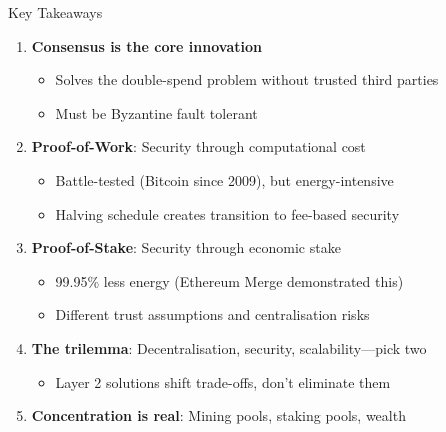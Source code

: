 \documentclass[10pt]{beamer}
\begin{document}
\begin{frame}{Key Takeaways}
  \begin{enumerate}
    \item \textbf{Consensus is the core innovation}
    \begin{itemize}
      \item Solves the double-spend problem without trusted third parties
      \item Must be Byzantine fault tolerant
    \end{itemize}
    
    \vspace{0.3em}
    \item \textbf{Proof-of-Work}: Security through computational cost
    \begin{itemize}
      \item Battle-tested (Bitcoin since 2009), but energy-intensive
      \item Halving schedule creates transition to fee-based security
    \end{itemize}
    
    \vspace{0.3em}
    \item \textbf{Proof-of-Stake}: Security through economic stake
    \begin{itemize}
      \item 99.95\% less energy (Ethereum Merge demonstrated this)
      \item Different trust assumptions and centralisation risks
    \end{itemize}
    
    \vspace{0.3em}
    \item \textbf{The trilemma}: Decentralisation, security, scalability---pick two
    \begin{itemize}
      \item Layer 2 solutions shift trade-offs, don't eliminate them
    \end{itemize}
    
    \vspace{0.3em}
    \item \textbf{Concentration is real}: Mining pools, staking pools, wealth
  \end{enumerate}
\end{frame}
\end{document}
